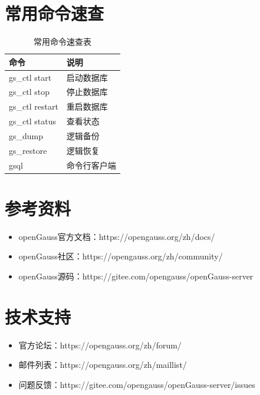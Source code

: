 \documentclass[12pt,UTF8]{ctexbook}
\begin{document}
\section{常用命令速查}

\begin{table}[htbp]
    \centering
    \caption{常用命令速查表}
    \label{tab:command_reference}
    \begin{tabular}{|l|l|}
    \hline
    \textbf{命令} & \textbf{说明} \\ \hline
    gs\_ctl start & 启动数据库 \\ \hline
    gs\_ctl stop & 停止数据库 \\ \hline
    gs\_ctl restart & 重启数据库 \\ \hline
    gs\_ctl status & 查看状态 \\ \hline
    gs\_dump & 逻辑备份 \\ \hline
    gs\_restore & 逻辑恢复 \\ \hline
    gsql & 命令行客户端 \\ \hline
    \end{tabular}
\end{table}

\section{参考资料}

\begin{itemize}[leftmargin=2cm]
    \item openGauss官方文档：https://opengauss.org/zh/docs/
    \item openGauss社区：https://opengauss.org/zh/community/
    \item openGauss源码：https://gitee.com/opengauss/openGauss-server
\end{itemize}

\section{技术支持}

\begin{itemize}[leftmargin=2cm]
    \item 官方论坛：https://opengauss.org/zh/forum/
    \item 邮件列表：https://opengauss.org/zh/maillist/
    \item 问题反馈：https://gitee.com/opengauss/openGauss-server/issues
\end{itemize}

\backmatter
\end{document}
